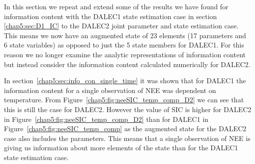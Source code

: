 In this section we repeat and extend some of the results we have found for information content with the DALEC1 state estimation case in section \ref{chap5:sec:D1_IC} to the DALEC2 joint parameter and state estimation case. This means we now have an augmented state of 23 elements (17 parameters and 6 state variables) as opposed to just the 5 state members for DALEC1. For this reason we no longer examine the analytic representations of information content but instead consider the information content calculated numerically for DALEC2. 

In section~\ref{chap5:sec:info_con_single_time} it was shown that for DALEC1 the information content for a single observation of NEE was dependent on temperature. From Figure~\ref{chap5:fig:neeSIC_temp_comp_D2} we can see that this is still the case for DALEC2. However the value of SIC is higher for DALEC2 in Figure~\ref{chap5:fig:neeSIC_temp_comp_D2} than for DALEC1 in Figure~\ref{chap5:fig:neeSIC_temp_comp} as the augmented state for the DALEC2 case also includes the parameters. This means that a single observation of NEE is giving us information about more elements of the state than for the DALEC1 state estimation case.

